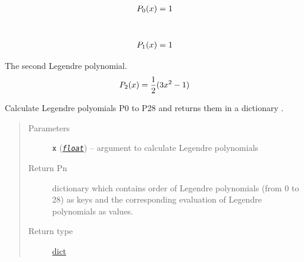\documentclass[a4paper,10pt,english]{sphinxmanual}
\begin{document}
\begin{fulllineitems}
\label{api/climlab.utils:climlab.utils.legendre.P0}~\begin{gather}
\begin{split}P_0 (x) = 1\end{split}\notag
\end{gather}
\end{fulllineitems}


\begin{fulllineitems}
\label{api/climlab.utils:climlab.utils.legendre.P1}~\begin{gather}
\begin{split}P_1 (x) = 1\end{split}\notag
\end{gather}
\end{fulllineitems}


\begin{fulllineitems}
\label{api/climlab.utils:climlab.utils.legendre.P2}
The second Legendre polynomial.
\begin{gather}
\begin{split}P_2(x) = \frac{1}{2} (3x^2 - 1)\end{split}\notag
\end{gather}
\end{fulllineitems}


\begin{fulllineitems}
\label{api/climlab.utils:climlab.utils.legendre.Pn}
Calculate Legendre polyomials P0 to P28 and returns them 
in a dictionary .
\begin{quote}\begin{description}
\item[{Parameters}] \leavevmode
\textbf{\texttt{x}} (\href{http://docs.python.org/2.7/library/functions.html\#float}{\emph{\texttt{float}}}) -- argument to calculate Legendre polynomials

\item[{Return Pn}] \leavevmode
dictionary which contains order of Legendre polynomials
(from 0 to 28) as keys and the corresponding evaluation
of Legendre polynomials as values.

\item[{Return type}] \leavevmode
\href{http://docs.python.org/2.7/library/stdtypes.html\#dict}{dict}

\end{description}\end{quote}

\end{fulllineitems}
\end{document}
